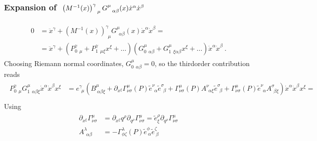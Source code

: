 \documentclass[letterpaper,10pt,english]{jupyterBook}
\begin{document}
\subsubsection*{Expansion of \protect\(\ \left( M^{-1}(x) \right)^{\gamma}_{\ \ \mu} G^{\mu}_{\ \ \alpha \beta}(x) \dot{x}^\alpha \dot{x}^\beta\protect\)}
\begin{equation*}
\begin{split}\begin{aligned}
  0 
  & = \ddot{x}^\gamma + \left( M^{-1}(x) \right)^{\gamma}_{\ \ \mu} G^{\mu}_{\ \ \alpha \beta}(x) \dot{x}^\alpha \dot{x}^\beta = \\
  & = \ddot{x}^\gamma + \left( P^{\gamma}_{0\ \ \mu} + P^{\gamma}_{1 \ \ \mu\xi} x^{\xi} + \dots \right) \left( G^{\mu}_{0\ \ \alpha \beta} + G^{\mu}_{1\ \ \xi\alpha\beta} x^{\xi} + \dots \right) \dot{x}^\alpha \dot{x}^\beta \ .
\end{aligned}\end{split}
\end{equation*}
\sphinxAtStartPar
{} Choosing Riemann normal coordinates, \(G^{\mu}_{0\ \ \alpha \beta} = 0\), so the third\sphinxhyphen{}order contribution reads
\begin{equation*}
\begin{split}\begin{aligned}
  P^{\gamma}_{0\ \ \mu} G^{\mu}_{1\ \ \alpha \beta \xi} \dot{x}^\alpha \dot{x}^\beta x^\xi
  & = e^{\gamma}_{\ \ \mu} \left( B^{\mu}_{\ \alpha \beta \xi} + \partial_{x^{\xi}} \Gamma^{\mu}_{\nu \sigma}(P) \widetilde{e}^{\nu}_{\ \ \alpha} \widetilde{e}^{\sigma}_{\ \ \beta} + \Gamma^{\mu}_{\nu \sigma}(P) A^{\nu}_{\ \ \alpha \xi} \widetilde{e}^{\sigma}_{\ \ \beta} + \Gamma^{\mu}_{\nu \sigma}(P) \widetilde{e}^{\nu}_{\ \ \alpha} A^{\sigma}_{\ \ \beta \xi} \right) \dot{x}^\alpha \dot{x}^\beta x^\xi = \\
\end{aligned}\end{split}
\end{equation*}
\sphinxAtStartPar
Using
\begin{equation*}
\begin{split}\begin{aligned}
  \partial_{x^\xi} \Gamma^{\mu}_{\nu \sigma} & = \partial_{x^\xi} q^{\rho} \partial_{q^{\rho}} \Gamma^{\mu}_{\nu \sigma} = \widetilde{e}^{\rho}_{\xi} \partial_{q^{\rho}} \Gamma^{\mu}_{\nu \sigma} \\
  A^{\lambda}_{\ \ \alpha \beta} & = -\Gamma^{\lambda}_{\phi \zeta}(P) \widetilde{e}^{\phi}_{\ \alpha} \widetilde{e}^{\zeta}_{\ \beta} \\
\end{aligned}\end{split}
\end{equation*}
\end{document}
